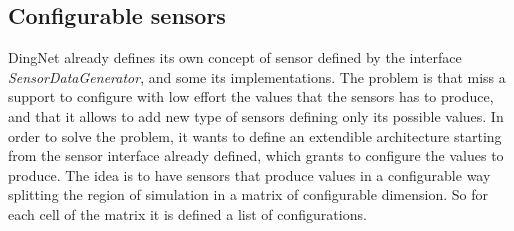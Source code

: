 \subsection{Configurable sensors}
DingNet already defines its own concept of sensor defined by the interface \mbox{\textit{SensorDataGenerator}}, and some its implementations.
The problem is that miss a support to configure with low effort the values that the sensors has to produce, and that it allows to add new type of sensors defining only its possible values.
In order to solve the problem, it wants to define an extendible architecture starting from the sensor interface already defined, which grants to configure the values to produce.
The idea is to have sensors that produce values in a configurable way splitting the region of simulation in a matrix of configurable dimension.
So for each cell of the matrix it is defined a list of configurations. 

